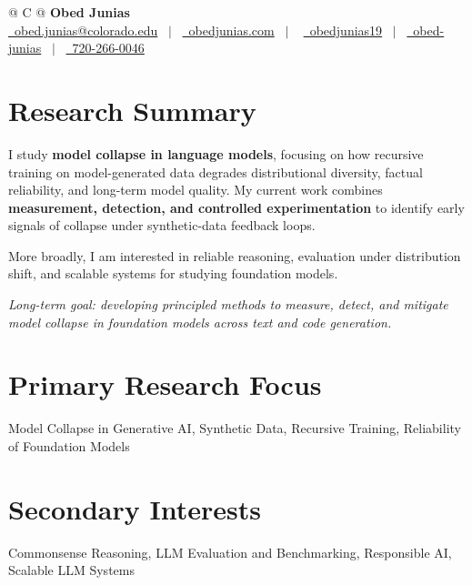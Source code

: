 \documentclass[a4paper,11pt]{article}
\begin{document}
\pagestyle{empty} 



\begin{tabularx}{\linewidth}{@{} C @{}}
  \Huge {\textbf{Obed Junias} }\\[1pt]
  \href{mailto:obed.junias@colorado.edu}{\raisebox{-0.05\height}\faEnvelope \ obed.junias@colorado.edu} \ $|$ \
  \href{https://obedjunias.github.io}{\raisebox{-0.05\height}\faGlobe\ obedjunias.com} \ $|$ \
  \href{https://github.com/obedjunias19}{\raisebox{-0.05\height}\faGithub \ obedjunias19} \ $|$ \
  \href{https://linkedin.com/in/obed-junias}{\raisebox{-0.05\height}\faLinkedin\ obed-junias} \ $|$ \
  \href{tel:+1720-266-0046}{\raisebox{-0.05\height}\faMobile \ 720-266-0046} \\
\end{tabularx}


\color{BlueViolet}
\section*{Research Summary}
\color{black}
I study \textbf{model collapse in language models}, focusing on how recursive training on model-generated data degrades distributional diversity, factual reliability, and long-term model quality. My current work combines \textbf{measurement, detection, and controlled experimentation} to identify early signals of collapse under synthetic-data feedback loops.

More broadly, I am interested in reliable reasoning, evaluation under distribution shift, and scalable systems for studying foundation models.

\textit{Long-term goal: developing principled methods to measure, detect, and mitigate model collapse in foundation models across text and code generation.}

\color{BlueViolet}
\section*{Primary Research Focus}
\color{black}
Model Collapse in Generative AI, Synthetic Data, Recursive Training, Reliability of Foundation Models

\color{BlueViolet}
\section*{Secondary Interests}
\color{black}
Commonsense Reasoning, LLM Evaluation and Benchmarking, Responsible AI, Scalable LLM Systems
\end{document}
